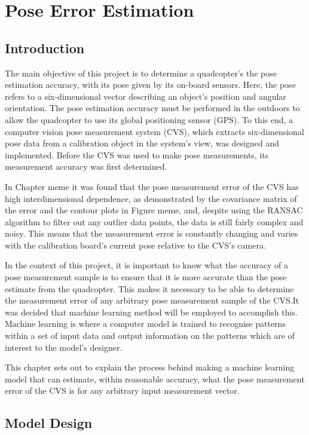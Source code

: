 \chapter{Pose Error Estimation}

\section{Introduction}

The main objective of this project is to determine a quadcopter's the pose estimation accuracy, with its pose given by its on-board sensors. Here, the pose refers to a six-dimensional vector describing an object's position and angular orientation. The pose estimation accuracy must be performed in the outdoors to allow the quadcopter to use its global positioning sensor (GPS). To this end, a computer vision pose measurement system (CVS), which extracts six-dimensional pose data from a calibration object in the system's view, was designed and implemented. Before the CVS was used to make pose measurements, its measurement accuracy was first determined. 

In Chapter meme it was found that the pose measurement error of the CVS has high interdimensional dependence, as demonstrated by the covariance matrix of the error and the contour plots in Figure meme, and, despite using the RANSAC algorithm to filter out any outlier data points, the data is still fairly complex and noisy. This means that the measurement error is constantly changing and varies with the calibration board's current pose relative to the CVS's camera.

In the context of this project, it is important to know what the accuracy of a pose measurement sample is to ensure that it is more accurate than the pose estimate from the quadcopter. This makes it necessary to be able to determine the measurement error of any arbitrary pose measurement sample of the CVS.\@ It was decided that machine learning method will be employed to accomplish this. Machine learning is where a computer model is trained to recognise patterns within a set of input data and output information on the patterns which are of interest to the model's designer. 

This chapter sets out to explain the process behind making a machine learning model that can estimate, within reasonable accuracy, what the pose measurement error of the CVS is for any arbitrary input measurement vector. 

\section{Model Design}

